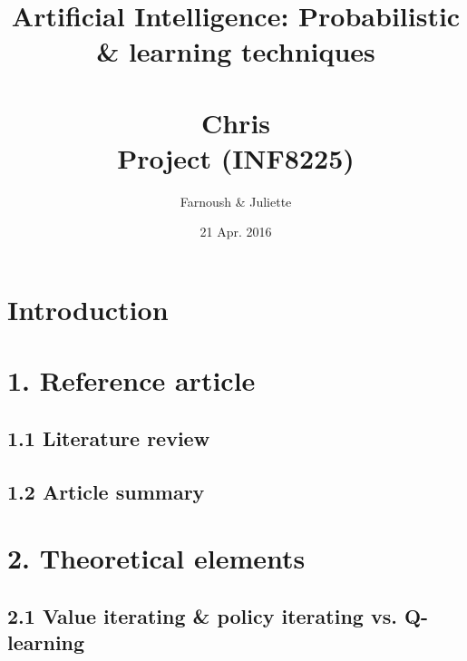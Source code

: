 \documentclass[a4paper, 12pt]{report}
\begin{document}
\def\labelitemi{$\bullet$}

\title{{\Large \textbf{Artificial Intelligence: Probabilistic \& learning techniques\\ } \\Chris {} \\ Project (INF8225)}}
\author{Farnoush  \& Juliette } 
\date{21 Apr. 2016}

\maketitle

\setcounter{tocdepth}{5}

\tableofcontents

\newpage

\chapter*{Introduction}

\chapter*{1. Reference article}

\section*{1.1 Literature review}

\section*{1.2 Article summary}

\chapter*{2. Theoretical elements}

\section*{2.1 Value iterating \& policy iterating vs. Q-learning}
\end{document}
